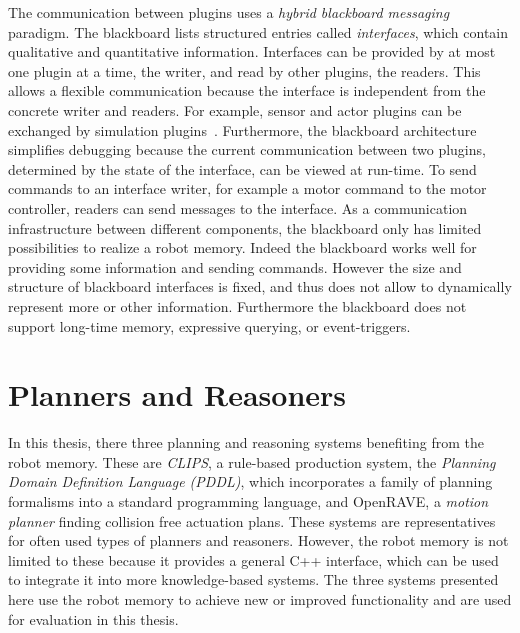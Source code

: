 The communication between plugins uses a \emph{hybrid blackboard messaging}
paradigm. The blackboard lists structured entries called
\emph{interfaces}, which contain qualitative and quantitative
information.  Interfaces can be provided by at most one plugin at a time, the
writer, and read by other plugins, the readers. This allows a flexible
communication because the interface is independent from the concrete
writer and readers.  For example, sensor and actor plugins can be
exchanged by simulation plugins~\cite{Gazsim-Thesis,LLSF-Sim}.
Furthermore, the blackboard architecture simplifies
debugging because the current communication between two plugins,
determined by the state of the interface, can be viewed at
run-time. To send commands to an interface writer, for example a motor
command to the motor controller, readers can send messages to the
interface.
As a communication infrastructure between different components, the
blackboard only has limited possibilities to realize a robot memory.
Indeed the blackboard works well for providing some information and sending
commands. However the size
and structure of blackboard interfaces is fixed, and thus does not
allow to dynamically represent more or other information.  Furthermore
the blackboard does not support long-time memory, expressive querying,
or event-triggers.

\section{Planners and Reasoners}
\label{sec:planners}
In this thesis, there three planning and reasoning systems benefiting
from the robot memory. These are \emph{CLIPS}, a
rule-based production system, the \emph{Planning Domain Definition
  Language (PDDL)}, which incorporates a family of planning formalisms
into a standard programming language, and OpenRAVE, a \emph{motion
  planner} finding collision free actuation plans.  These systems are
representatives for often used types of planners and
reasoners. However, the robot memory is not limited to these because
it provides a general C++ interface, which can be used to integrate it
into more knowledge-based systems. The three systems presented here use the robot memory
to achieve new or improved functionality and are used for evaluation in this
thesis.


